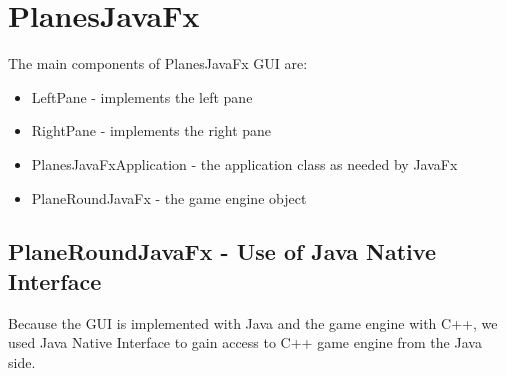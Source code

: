 \section {PlanesJavaFx}

The main components of PlanesJavaFx GUI are:

\begin{itemize}
	\item LeftPane - implements the left pane
	\item RightPane - implements the right pane
	\item PlanesJavaFxApplication  - the application class as needed by JavaFx
	\item PlaneRoundJavaFx - the game engine object
\end{itemize}


\subsection {PlaneRoundJavaFx - Use of Java Native Interface}

Because the GUI is implemented with Java and the game engine with C++, we used Java Native Interface to gain access to C++ game engine from the Java side. 

